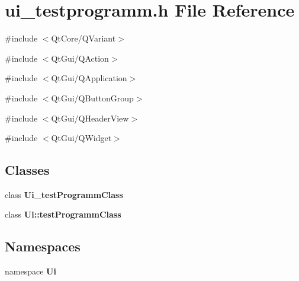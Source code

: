 \section{ui\_\-testprogramm.h File Reference}
\label{ui__testprogramm_8h}
{\ttfamily \#include $<$QtCore/QVariant$>$}\par
{\ttfamily \#include $<$QtGui/QAction$>$}\par
{\ttfamily \#include $<$QtGui/QApplication$>$}\par
{\ttfamily \#include $<$QtGui/QButtonGroup$>$}\par
{\ttfamily \#include $<$QtGui/QHeaderView$>$}\par
{\ttfamily \#include $<$QtGui/QWidget$>$}\par
\subsection*{Classes}
\begin{DoxyCompactItemize}
\item 
class {\bf Ui\_\-testProgrammClass}
\item 
class {\bf Ui::testProgrammClass}
\end{DoxyCompactItemize}
\subsection*{Namespaces}
\begin{DoxyCompactItemize}
\item 
namespace {\bf Ui}
\end{DoxyCompactItemize}

